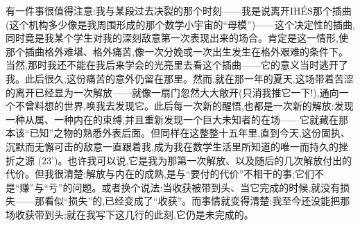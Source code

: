 有一件事很值得注意:我与某段过去决裂的那个时刻——我是说离开IHÉS那个插曲(这个机构多少像是我周围形成的那个数学小宇宙的“母模”)——这个决定性的插曲,同时竟是我某个学生对我的深刻敌意第一次表现出来的场合。肯定是这一情形,使那个插曲格外难堪、格外痛苦,像一次分娩或一次出生发生在格外艰难的条件下。当然,那时我还不能在我后来学会的光亮里去看这个插曲——它的意义当时逃开了我。此后很久,这份痛苦的意外仍留在那里。然而,就在那一年的夏天,这场带着苦涩的离开已经显为一次解放——就像一扇门忽然大大敞开(只消我推它一下!),通向一个不曾料想的世界,唤我去发现它。此后每一次新的醒悟,也都是一次新的解放:发现一种从属、一种内在的束缚,并且重新发现一个巨大未知者的在场——它就藏在那本该“已知”之物的熟悉外表后面。但同样在这整整十五年里,直到今天,这份固执、沉默而无懈可击的敌意一直跟着我,成为我在数学生活里所知道的唯一而持久的挫折之源 (23')。也许我可以说,它是我为那第一次解放、以及随后的几次解放付出的代价。但我很清楚:解放与内在的成熟,是与“要付的代价”不相干的事;它们不是“赚”与“亏”的问题。或者换个说法:当收获被带到头、当它完成的时候,就没有损失——那看似“损失”的,已经变成了“收获”。而事情就变得清楚:我至今还没能把那场收获带到头;就在我写下这几行的此刻,它仍是未完成的。
